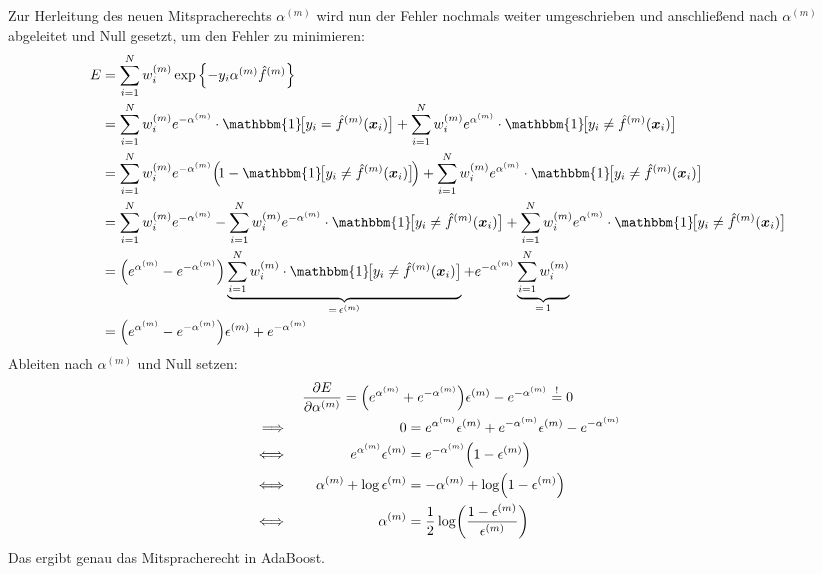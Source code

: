 				Zur Herleitung des neuen Mitspracherechts \( \alpha^{(m)} \) wird nun der Fehler nochmals weiter umgeschrieben und anschließend nach \(\alpha^{(m)}\) abgeleitet und Null gesetzt, um den Fehler zu minimieren:
				\begin{align}
					E
						&= \sum_{i = 1}^{N} w_i^{(m)} \exp\Big\{ { \textstyle  -y_i \alpha^{(m)} \hat{f}^{(m)} } \Big\} \\
						&= \sum_{i = 1}^{N} w_i^{(m)} e^{-\alpha^{(m)}} \cdot \mathbbm{1}\!\big[ y_i = \hat{f}^{(m)}(\vec{x}_i) \big] + \sum_{i = 1}^{N} w_i^{(m)} e^{\alpha^{(m)}} \cdot \mathbbm{1}\!\big[ y_i \neq \hat{f}^{(m)}(\vec{x}_i) \big] \\
						&= \sum_{i = 1}^{N} w_i^{(m)} e^{-\alpha^{(m)}} \Big(\! 1 - \mathbbm{1}\!\big[ y_i \neq \hat{f}^{(m)}(\vec{x}_i) \big] \!\Big) + \sum_{i = 1}^{N} w_i^{(m)} e^{\alpha^{(m)}} \cdot \mathbbm{1}\!\big[ y_i \neq \hat{f}^{(m)}(\vec{x}_i) \big] \\
						&= \sum_{i = 1}^{N} w_i^{(m)} e^{-\alpha^{(m)}} - \sum_{i = 1}^{N} w_i^{(m)} e^{-\alpha^{(m)}} \cdot \mathbbm{1}\!\big[ y_i \neq \hat{f}^{(m)}(\vec{x}_i) \big] + \sum_{i = 1}^{N} w_i^{(m)} e^{\alpha^{(m)}} \cdot \mathbbm{1}\!\big[ y_i \neq \hat{f}^{(m)}(\vec{x}_i) \big] \\
						&= \Big( e^{\alpha^{(m)}} - e^{-\alpha^{(m)}} \Big) \underbrace{\sum_{i = 1}^{N} w_i^{(m)} \cdot \mathbbm{1}\!\big[ y_i \neq \hat{f}^{(m)}(\vec{x}_i) \big]}_{=\, \epsilon^{(m)}} + e^{-\alpha^{(m)}} \underbrace{\sum_{i = 1}^{N} w_i^{(m)}}_{=\, 1} \\
						&= \Big( e^{\alpha^{(m)}} - e^{-\alpha^{(m)}} \Big) \epsilon^{(m)} + e^{-\alpha^{(m)}} \\
				\end{align}
				Ableiten nach \( \alpha^{(m)} \) und Null setzen:
				\begin{gather}
					\pdv{E}{\alpha^{(m)}} = \Big( e^{\alpha^{(m)}} + e^{-\alpha^{(m)}} \Big) \epsilon^{(m)} - e^{-\alpha^{(m)}} \overset{!}{=} 0 \\
					\begin{aligned}[t]
						\implies\quad&&
						0 &= e^{\alpha^{(m)}} \epsilon^{(m)} + e^{-\alpha^{(m)}} \epsilon^{(m)} - e^{-\alpha^{(m)}} \\
						\iff\quad&&
						e^{\alpha^{(m)}} \epsilon^{(m)} &= e^{-\alpha^{(m)}} \Big( 1 - \epsilon^{(m)} \Big) \\
						\iff\quad&&
						\alpha^{(m)} + \log \epsilon^{(m)} &= -\alpha^{(m)} + \log( 1 - \epsilon^{(m)} ) \\
						\iff\quad&&
						\alpha^{(m)} &= \frac{1}{2} \log( \frac{1 - \epsilon^{(m)}}{\epsilon^{(m)}} )
					\end{aligned}
				\end{gather}
				Das ergibt genau das Mitspracherecht in AdaBoost.

